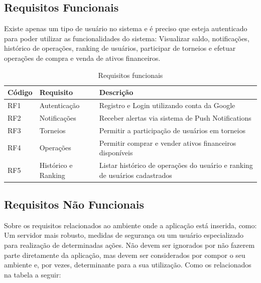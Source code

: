 \subsection{Requisitos Funcionais}
Existe apenas um tipo de usuário no sistema e é preciso que esteja autenticado para poder utilizar as funcionalidades do sistema: Visualizar saldo, notificações, histórico de operações, ranking de usuários, participar de torneios e efetuar operações de compra e venda de ativos financeiros.

\begin{table}[htbp]
	\scriptsize
	\centering
	\begin{tabular}{|l|l|l|}
		\hline \textbf{Código} & \textbf{Requisito} & \textbf{Descrição} \\ 
		\hline RF1 & Autenticação & Registro e Login utilizando conta da Google \\
		\hline RF2 & Notificações & Receber alertas via sistema de Push Notifications \\
		\hline RF3 & Torneios & Permitir a participação de usuários em torneios \\
		\hline RF4 & Operações & Permitir comprar e vender ativos financeiros disponíveis \\
		\hline RF5 & Histórico e Ranking & Listar histórico de operações do usuário e ranking de usuários cadastrados \\
		\hline 
	\end{tabular}
	\caption{Requisitos funcionais}
	\label{tab:requisitos_funcionais_admin}
\end{table}

\subsection{Requisitos Não Funcionais}

Sobre os requisitos relacionados ao ambiente onde a aplicação está inserida, como: Um servidor mais robusto, medidas de segurança ou um usuário especializado para realização de determinadas ações. Não devem ser ignorados por não fazerem parte diretamente da aplicação, mas devem ser considerados por compor o seu ambiente e, por vezes, determinante para a sua utilização. Como os relacionados na tabela a seguir:

